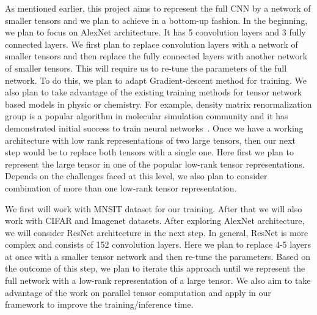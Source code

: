 As mentioned earlier, this project aims to represent the full CNN by a network of smaller tensors and we plan to achieve in a bottom-up fashion. In the beginning, we plan to focus on AlexNet architecture. It has 5 convolution layers and 3 fully connected layers. We first plan to replace convolution layers with a network of smaller tensors and then replace the fully connected layers with another network of smaller tensors. This will require us to re-tune the parameters of the full network. To do this, we plan to adapt Gradient-descent method for training. We also plan to take advantage of the existing training methods for tensor network based models in physic or chemistry. For example, density matrix renormalization group is a popular algorithm in molecular simulation community and it has demonstrated initial success to train neural networks~\cite{SS-NIPS2016}. Once we have a working architecture with low rank representations of two large tensors, then our next step would be to replace both tensors with a single one. Here first we plan to represent the large tensor in one of the popular low-rank tensor representations. Depends on the challenges faced at this level, we also plan to consider combination of more than one low-rank tensor representation.    


We first will work with  MNSIT dataset for our training. After that we will also work with CIFAR and Imagenet datasets. After exploring AlexNet architecture, we will consider ResNet architecture in the next step. In general, ResNet is more complex and consists of 152 convolution layers. Here we plan to replace 4-5 layers at once with a smaller tensor network and then re-tune the parameters. Based on the outcome of this step, we plan to iterate this approach until we represent the full network with a low-rank representation of a large tensor. We also aim to take advantage of the  work on parallel tensor computation and apply in our framework to improve the training/inference time.


